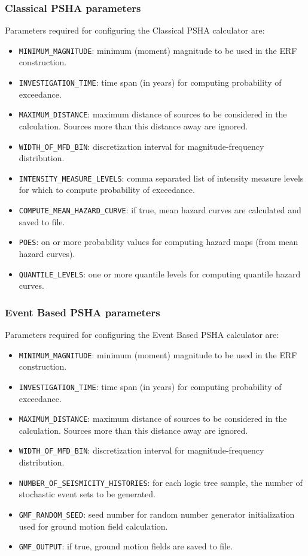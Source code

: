 \subsubsection{Classical PSHA parameters}
Parameters required for configuring the Classical PSHA calculator are:
\begin{itemize}
\item \Verb+MINIMUM_MAGNITUDE+: minimum (moment) magnitude to be used in the ERF construction.
\item \Verb+INVESTIGATION_TIME+: time span (in years) for computing probability of exceedance.
\item \Verb+MAXIMUM_DISTANCE+: maximum distance of sources to be considered in the calculation. Sources more than this distance away are ignored.
\item \Verb+WIDTH_OF_MFD_BIN+: discretization interval for  magnitude-frequency distribution.
\item \Verb+INTENSITY_MEASURE_LEVELS+: comma separated list of intensity measure levels for which to compute probability of exceedance.
\item \Verb+COMPUTE_MEAN_HAZARD_CURVE+: if true, mean hazard curves are calculated and saved to file.
\item \Verb+POES+: on or more probability values for computing hazard maps (from mean hazard curves).
\item \Verb+QUANTILE_LEVELS+: one or more quantile levels for computing quantile hazard curves.
\end{itemize}

\subsubsection{Event Based PSHA parameters}
Parameters required for configuring the Event Based PSHA calculator are:
\begin{itemize}
\item \Verb+MINIMUM_MAGNITUDE+: minimum (moment) magnitude to be used in the ERF construction.
\item \Verb+INVESTIGATION_TIME+: time span (in years) for computing probability of exceedance.
\item \Verb+MAXIMUM_DISTANCE+: maximum distance of sources to be considered in the calculation. Sources more than this distance away are ignored.
\item \Verb+WIDTH_OF_MFD_BIN+: discretization interval for  magnitude-frequency distribution.
\item \Verb+NUMBER_OF_SEISMICITY_HISTORIES+: for each logic tree sample, the number of stochastic event sets to be generated.
\item \Verb+GMF_RANDOM_SEED+: seed number for random number generator initialization used for ground motion field calculation.
\item \Verb+GMF_OUTPUT+: if true, ground motion fields are saved to file.
\end{itemize}